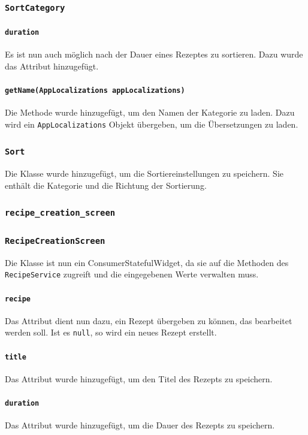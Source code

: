 \documentclass{implementierungsheft}
\begin{document}
\subsubsection*{\texttt{SortCategory}}
\paragraph*{\texttt{duration}}
Es ist nun auch möglich nach der Dauer eines Rezeptes zu sortieren. Dazu wurde das Attribut hinzugefügt.
\paragraph*{\texttt{getName(AppLocalizations appLocalizations)}}
Die Methode wurde hinzugefügt, um den Namen der Kategorie zu laden. Dazu wird ein \texttt{AppLocalizations} Objekt übergeben, um die Übersetzungen zu laden.
\subsubsection*{\texttt{Sort}}
Die Klasse wurde hinzugefügt, um die Sortiereinstellungen zu speichern. Sie enthält die Kategorie und die Richtung der Sortierung.
\subsubsection{\texttt{recipe\_creation\_screen}}
\subsubsection*{\texttt{RecipeCreationScreen}}
Die Klasse ist nun ein ConsumerStatefulWidget, da sie auf die Methoden des \texttt{RecipeService} zugreift und die eingegebenen Werte verwalten muss.
\paragraph{\texttt{recipe}}
Das Attribut dient nun dazu, ein Rezept übergeben zu können, das bearbeitet werden soll. Ist es \texttt{null}, so wird ein neues Rezept erstellt.
\paragraph{\texttt{title}}
Das Attribut wurde hinzugefügt, um den Titel des Rezepts zu speichern.
\paragraph{\texttt{duration}}
Das Attribut wurde hinzugefügt, um die Dauer des Rezepts zu speichern.
\end{document}
